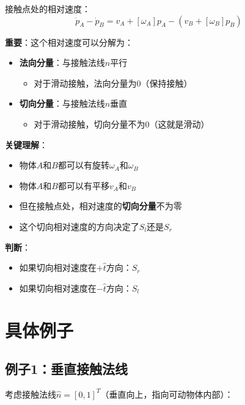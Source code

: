 \documentclass[12pt,a4paper]{article}
\begin{document}
接触点处的相对速度：
\begin{equation}
\dot{p}_A - \dot{p}_B = v_A + [\omega_A]p_A - (v_B + [\omega_B]p_B)
\end{equation}

\textbf{重要}：这个相对速度可以分解为：
\begin{itemize}
\item \textbf{法向分量}：与接触法线$\hat{n}$平行
  \begin{itemize}
  \item 对于滑动接触，法向分量为0（保持接触）
  \end{itemize}
\item \textbf{切向分量}：与接触法线$\hat{n}$垂直
  \begin{itemize}
  \item 对于滑动接触，切向分量不为0（这就是滑动）
  \end{itemize}
\end{itemize}

\textbf{关键理解}：
\begin{itemize}
\item 物体$A$和$B$都可以有旋转$\omega_A$和$\omega_B$
\item 物体$A$和$B$都可以有平移$v_A$和$v_B$
\item 但在接触点处，相对速度的\textbf{切向分量}不为零
\item 这个切向相对速度的方向决定了$S_l$还是$S_r$
\end{itemize}

\textbf{判断}：
\begin{itemize}
\item 如果切向相对速度在$+\hat{t}$方向：$S_r$
\item 如果切向相对速度在$-\hat{t}$方向：$S_l$
\end{itemize}

\section{具体例子}

\subsection{例子1：垂直接触法线}

考虑接触法线$\hat{n} = [0, 1]^T$（垂直向上，指向可动物体内部）：

\begin{center}
\end{center}
\end{document}

